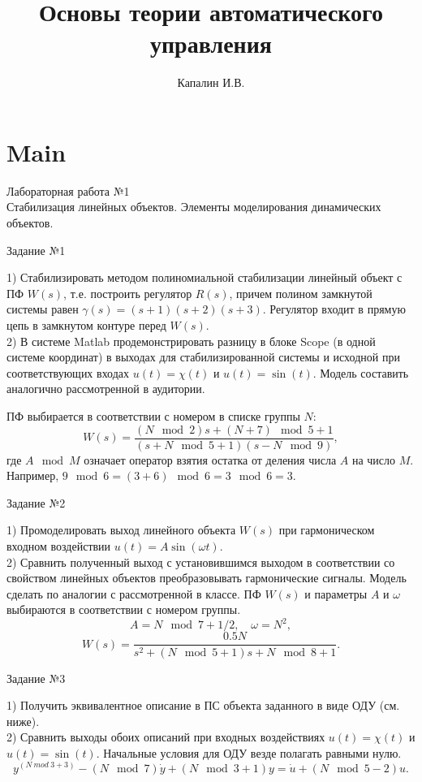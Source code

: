 \documentclass{beamer}
\title[Основы теории автоматического управления]{Основы теории автоматического управления}
\author{Капалин И.В.}
\institute[\text{МИСиС ИК}]{НИТУ МИСиС\\ Кафедра инженерной кибернетики}
\theoremstyle{plain}
\theoremstyle{definition}
\theoremstyle{remark}
\theoremstyle{plain}
\begin{document}
\section{Main}

\begin{frame}

\begin{center}
{\LARGE
Лабораторная работа №1\\
Стабилизация линейных объектов. Элементы моделирования динамических объектов. }
\end{center}

\end{frame}


\begin{frame}{Задание №1}


1) Стабилизировать методом полиномиальной стабилизации линейный объект с ПФ $W(s)$, т.е. построить регулятор $R(s)$, причем полином замкнутой системы равен $\gamma(s) = (s+1)(s+2)(s+3)$. Регулятор входит в прямую цепь в замкнутом контуре перед $W(s)$.\\
2) В системе Matlab продемонстрировать разницу в блоке Scope (в одной системе координат) в выходах для стабилизированной системы и исходной при соответствующих входах $u(t) = \chi(t)$ и $u(t) = \sin(t)$. Модель составить аналогично рассмотренной в аудитории.

ПФ выбирается в соответствии с номером в списке группы $N$:
$$
W(s) = \frac{(N\mod2)s+(N+7)\mod5+1}{(s+ N\mod5 + 1 )(s- N\mod9)},
$$
где $A \mod M$ означает оператор взятия остатка от деления числа $A$ на число $M$.
Например, $ 9\mod6 = (3+6)\mod6 = 3\mod 6 = 3$.

\end{frame}

\begin{frame}{Задание №2}

1) Промоделировать выход линейного объекта $W(s)$ при гармоническом входном воздействии $u(t) = A\sin(\omega t)$.\\
2) Сравнить полученный выход с установившимся выходом в соответствии со свойством линейных объектов преобразовывать гармонические сигналы. Модель сделать по аналогии с рассмотренной в классе. ПФ $W(s)$ и параметры $A$ и $\omega$ выбираются в соответствии с номером группы.
$$
A = N\mod7+1/2, \quad \omega = N^2,
$$
$$
W(s)= \frac{0.5N}{s^2+(N\mod 5 +1)s+ N\mod 8 +1}.
$$


\end{frame}


\begin{frame}{Задание №3}

1) Получить эквивалентное описание в ПС объекта заданного в виде ОДУ (см. ниже).\\
2) Сравнить выходы обоих описаний при входных воздействиях $u(t) = \chi(t)$ и $u(t) = \sin(t)$.
Начальные условия для ОДУ везде полагать равными нулю.
$$
y^{(N\ mod\ 3+3)} - (N\mod7)\dot y + (N\mod3+1)y = \dot u + (N\mod5-2)u.
$$

\end{frame}
\end{document}
